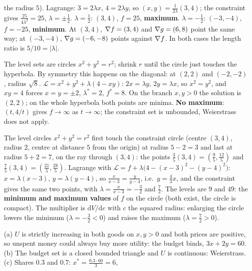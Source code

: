 \begin{solutions}
        the radius $5$). Lagrange: $3=2\lambda x$, $4=2\lambda y$, so
        $(x,y)=\tfrac1{2\lambda}(3,4)$; the constraint gives
        $\tfrac{25}{4\lambda^{2}}=25$, $\lambda=\pm\tfrac12$. $\lambda=\tfrac12$:
        $(3,4)$, $f=25$, \textbf{maximum}. $\lambda=-\tfrac12$: $(-3,-4)$,
        $f=-25$, \textbf{minimum}. At $(3,4)$, $\nabla f=(3,4)$ and
        $\nabla g=(6,8)$ point the same way; at $(-3,-4)$,
        $\nabla g=(-6,-8)$ points against $\nabla f$. In both cases the
        length ratio is $5/10=|\lambda|$.
  \item The level sets are circles $x^{2}+y^{2}=r^{2}$; shrink $r$ until the
        circle just touches the hyperbola. By symmetry this happens on the
        diagonal: at $(2,2)$ and $(-2,-2)$, radius $\sqrt8$.
        $\mathcal{L}=x^{2}+y^{2}+\lambda(4-xy)$: $2x=\lambda y$,
        $2y=\lambda x$, so $x^{2}=y^{2}$, and $xy=4$ forces $x=y=\pm2$,
        $\lambda^*=2$, $f^*=8$. On the branch $x,y>0$ the solution is
        $(2,2)$; on the whole hyperbola both points are minima.
        \textbf{No maximum}: $(t,4/t)$ gives $f\to\infty$ as $t\to\infty$;
        the constraint set is unbounded, Weierstrass does not apply.
  \item The level circles $x^{2}+y^{2}=r^{2}$ first touch the constraint
        circle (centre $(3,4)$, radius $2$, centre at distance $5$ from the
        origin) at radius $5-2=3$ and last at radius $5+2=7$, on the ray
        through $(3,4)$: the points $\tfrac35(3,4)=(\tfrac95,\tfrac{12}5)$
        and $\tfrac75(3,4)=(\tfrac{21}5,\tfrac{28}5)$. Lagrange with
        $\mathcal{L}=f+\lambda\bigl(4-(x-3)^{2}-(y-4)^{2}\bigr)$:
        $x=\lambda(x-3)$, $y=\lambda(y-4)$, so $\tfrac{x}{x-3}=\tfrac{y}{y-4}$,
        i.e.\ $y=\tfrac43x$, and the constraint gives the same two points,
        with $\lambda=\tfrac{x}{x-3}=-\tfrac32$ and $\tfrac72$. The levels
        are $9$ and $49$: the \textbf{minimum and maximum values} of $f$ on
        the circle (both exist, the circle is compact). The multiplier is
        $\mathrm{d}V/\mathrm{d}c$ with $c$ the squared radius: enlarging the
        circle lowers the minimum ($\lambda=-\tfrac32<0$) and raises the
        maximum ($\lambda=\tfrac72>0$).
  \item (a) $U$ is strictly increasing in both goods on $x,y>0$ and both
        prices are positive, so unspent money could always buy more
        utility: the budget binds, $3x+2y=60$. (b) The budget set is a
        closed bounded triangle and $U$ is continuous: Weierstrass.
        (c) Shares $0.3$ and $0.7$: $x^*=\tfrac{0.3\cdot60}{3}=6$,

\end{solutions}

